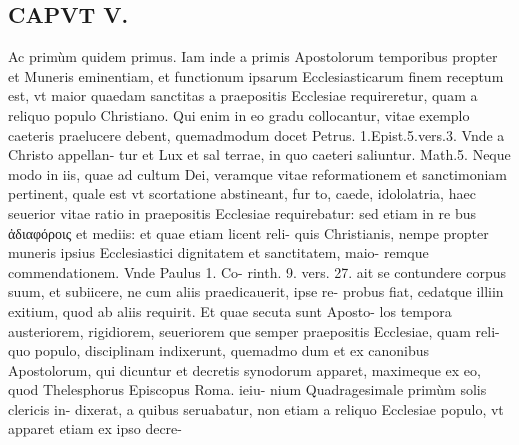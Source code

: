 \documentclass{article}
\begin{document}
\begin{pages}
\section*{CAPVT  V. }
\marginpar{[ p.371 ]}\pstart Ac primùm quidem primus.  \pend\pstart Iam inde a primis Apostolorum temporibus propter et Muneris eminentiam, et functionum ipsarum Ecclesiasticarum finem receptum est, vt maior quaedam sanctitas a praepositis Ecclesiae requireretur, quam a reliquo populo Christiano. Qui enim in eo gradu collocantur, vitae exemplo caeteris praelucere debent, quemadmodum docet Petrus. 1.Epist.5.vers.3. Vnde a Christo appellan- tur et Lux et sal terrae, in quo caeteri saliuntur. Math.5. Neque modo in iis, quae ad cultum Dei, veramque vitae reformationem et sanctimoniam pertinent, quale est vt scortatione abstineant, fur to, caede, idololatria, haec seuerior vitae ratio in praepositis Ecclesiae requirebatur: sed etiam in re bus ἀδιαφόροις et mediis: et quae etiam licent reli- quis Christianis, nempe propter muneris ipsius Ecclesiastici dignitatem et sanctitatem, maio- remque commendationem. Vnde Paulus 1. Co- rinth. 9. vers. 27. ait se contundere corpus suum, et subiicere, ne cum aliis praedicauerit, ipse re- probus fiat, cedatque illiin exitium, quod ab aliis requirit. Et quae secuta sunt Aposto- los tempora austeriorem, rigidiorem, seueriorem que semper praepositis Ecclesiae, quam reli- quo populo, disciplinam indixerunt, quemadmo dum et ex canonibus Apostolorum, qui dicuntur et decretis synodorum apparet, maximeque ex eo, quod Thelesphorus Episcopus Roma. ieiu- nium Quadragesimale primùm solis clericis in- dixerat, a quibus seruabatur, non etiam a reliquo Ecclesiae populo, vt apparet etiam ex ipso decre-  \pend

\end{pages}
\end{document}
